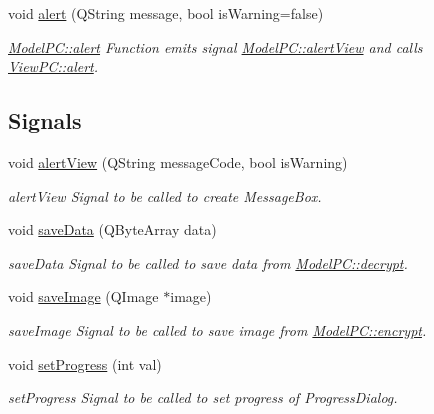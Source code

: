 \begin{DoxyCompactItemize}
void \hyperlink{class_model_p_c_a9079a101d83672aa48fd2dbac797de40}{alert} (Q\+String message, bool is\+Warning=false)
\begin{DoxyCompactList}\small\item\em \hyperlink{class_model_p_c_a9079a101d83672aa48fd2dbac797de40}{Model\+P\+C\+::alert} Function emits signal \hyperlink{class_model_p_c_af0217a7ca5671e26090dc50a5dccdaf5}{Model\+P\+C\+::alert\+View} and calls \hyperlink{class_view_p_c_a7c467169467789561078abc9d4fe57bd}{View\+P\+C\+::alert}. \end{DoxyCompactList}\end{DoxyCompactItemize}
\subsection*{Signals}
\begin{DoxyCompactItemize}
\item 
void \hyperlink{class_model_p_c_af0217a7ca5671e26090dc50a5dccdaf5}{alert\+View} (Q\+String message\+Code, bool is\+Warning)
\begin{DoxyCompactList}\small\item\em alert\+View Signal to be called to create Message\+Box. \end{DoxyCompactList}\item 
void \hyperlink{class_model_p_c_a0855107fb0ccc247cd9e893fae9bb08a}{save\+Data} (Q\+Byte\+Array data)
\begin{DoxyCompactList}\small\item\em save\+Data Signal to be called to save data from \hyperlink{class_model_p_c_a5995215a34a1e1f504035715a8013809}{Model\+P\+C\+::decrypt}. \end{DoxyCompactList}\item 
void \hyperlink{class_model_p_c_a41f5e2e8022679046e4d3fa1109025fa}{save\+Image} (Q\+Image $\ast$image)
\begin{DoxyCompactList}\small\item\em save\+Image Signal to be called to save image from \hyperlink{class_model_p_c_a6f191f62d4635d0d3555fcc0be298794}{Model\+P\+C\+::encrypt}. \end{DoxyCompactList}\item 
void \hyperlink{class_model_p_c_afdcd80f0ed5062e145a71f09b0897547}{set\+Progress} (int val)
\begin{DoxyCompactList}\small\item\em set\+Progress Signal to be called to set progress of Progress\+Dialog. \end{DoxyCompactList}\end{DoxyCompactItemize}
